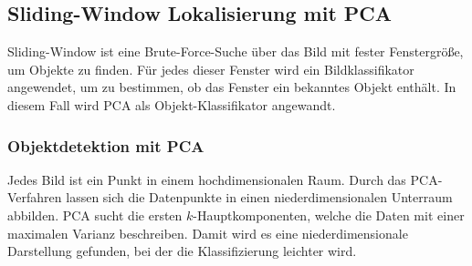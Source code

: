\subsection{Sliding-Window Lokalisierung mit PCA}
Sliding-Window ist eine Brute-Force-Suche über das Bild mit fester Fenstergröße, um Objekte zu finden. Für jedes dieser Fenster wird ein Bildklassifikator angewendet, um zu bestimmen, ob das Fenster ein bekanntes Objekt enthält. In diesem Fall wird PCA als Objekt-Klassifikator angewandt.
\subsubsection{Objektdetektion mit PCA}
Jedes Bild ist ein Punkt in einem hochdimensionalen Raum. Durch das PCA-Verfahren lassen sich die Datenpunkte in einen niederdimensionalen Unterraum abbilden. PCA sucht die ersten $k$-Hauptkomponenten, welche die Daten mit einer maximalen Varianz beschreiben. Damit wird es eine niederdimensionale Darstellung gefunden, bei der die Klassifizierung leichter wird.\\

